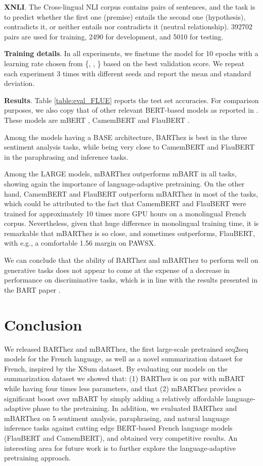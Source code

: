 \documentclass[11pt,a4paper]{article}
\begin{document}
\noindent  \textbf{XNLI}. The Cross-lingual NLI corpus \cite{conneau2018xnli} contains pairs of sentences, and the task is to predict whether the first one (premise) entails the second one (hypothesis), contradicts it, or neither entails nor contradicts it (neutral relationship). 392702 pairs are used for training, 2490 for development, and 5010 for testing.

\noindent\textbf{Training details}. In all experiments, we finetune the model for 10 epochs with a learning rate chosen from  \{, , \} based on the best validation score.
We repeat each experiment 3 times with different seeds and report the mean and standard deviation.

\noindent\textbf{Results}. Table \ref{table:eval_FLUE} reports the test set accuracies.
For comparison purposes, we also copy that of other relevant BERT-based models as reported in \citet{le2019flaubert}.
These models are mBERT \cite{devlin2018bert}, CamemBERT \cite{martin2019camembert} and FlauBERT \cite{le2019flaubert}.

Among the models having a BASE architecture, BARThez is best in the three sentiment analysis tasks, while being very close to CamemBERT and FlauBERT in the paraphrasing and inference tasks.

Among the LARGE models, mBARThez outperforms mBART in all tasks, showing again the importance of language-adaptive pretraining.
On the other hand, CamemBERT and FlauBERT outperform mBARThez in most of the tasks, which could be attributed to the fact that CamemBERT and FlauBERT were trained for approximately 10 times more GPU hours on a monolingual French corpus.
Nevertheless, given that huge difference in monolingual training time, it is remarkable that mBARThez is so close, and sometimes outperforms, FlauBERT, with e.g., a comfortable 1.56 margin on PAWSX.

We can conclude that the ability of BARThez and mBARThez to perform well on generative tasks does not appear to come at the expense of a decrease in performance on discriminative tasks, which is in line with the results presented in the BART paper \cite{lewis2019bart}.

\section{Conclusion}
We released BARThez and mBARThez, the first large-scale pretrained seq2seq models for the French language, as well as a novel summarization dataset for French, inspired by the XSum dataset.
By evaluating our models on the summarization dataset we showed that:
(1) BARThez is on par with mBART while having four times less parameters, and that (2) mBARThez provides a significant boost over mBART by simply adding a relatively affordable language-adaptive phase to the pretraining.
In addition, we evaluated BARThez and mBARThez on 5 sentiment analysis, paraphrasing, and natural language inference tasks against cutting edge BERT-based French language models (FlauBERT and CamemBERT), and obtained very competitive results.
An interesting area for future work is to further explore the language-adaptive pretraining approach.
\end{document}
